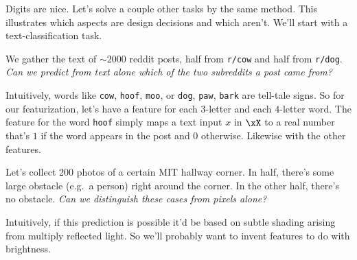 
  Digits are nice.  Let's solve a couple other tasks by the same method.  This
  illustrates which aspects are design decisions and which aren't.  We'll start
  with a text-classification task.

  We gather the text of $\sim 2000$ reddit posts, half from \texttt{r/cow} and
  half from \texttt{r/dog}.  \emph{Can we predict from text alone which of the
  two subreddits a post came from?}

  Intuitively, words like
  \texttt{cow},
  \texttt{hoof},
  \texttt{moo},
    or
  \texttt{dog},
  \texttt{paw},
  \texttt{bark}
  are tell-tale signs.  So for our featurization, let's have a feature for
  each $3$-letter and each $4$-letter word.  The feature for the word
  \texttt{hoof} simply maps a text input $x$ in $\xX$ to a real number that's
  $1$ if the word appears in the post and $0$ otherwise.  Likewise with the
  other features.

  Let's collect 200 photos of a certain MIT hallway corner.  In half, there's
  some large obstacle (e.g.\ a person) right around the corner.  In the other
  half, there's no obstacle.  \emph{Can we distinguish these cases from pixels
  alone?}

  Intuitively, if this prediction is possible it'd be based on subtle shading
  arising from multiply reflected light.  So we'll probably want to
  invent features to do with brightness.


